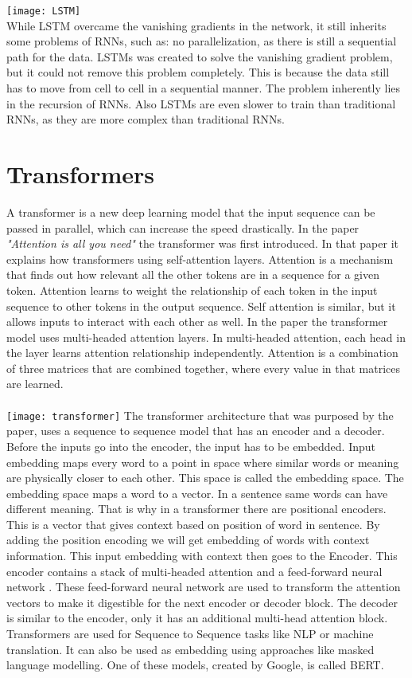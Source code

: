 \texttt{[image: LSTM]}
\\ While LSTM overcame the vanishing gradients in the network, it still inherits some problems of RNNs, such as: no parallelization, as there is still a sequential path for the data. LSTMs was created to solve the vanishing gradient problem, but it could not remove this problem completely. This is because the data still has to move from cell to cell in a sequential manner. The problem inherently lies in the recursion of RNNs. Also LSTMs are even slower to train than traditional RNNs, as they are more complex than traditional RNNs.

\section{Transformers}
A transformer is a new deep learning model that the input sequence can be passed in parallel, which can increase the speed drastically. In the paper \textit{"Attention is all you need"} \cite{Transformers} the transformer was first introduced. In that paper it explains how transformers using self-attention layers. Attention is a mechanism that finds out how relevant all the other tokens are in a sequence for a given token. Attention learns to weight the relationship of each token in the input sequence to other tokens in the output sequence. Self attention is similar, but it allows inputs to interact with each other as well. In the paper the transformer model uses multi-headed attention layers. In multi-headed attention, each head in the layer learns attention relationship independently. Attention is a combination of three matrices that are combined together, where every value in that matrices are learned.\\\\
\texttt{[image: transformer]}
The transformer architecture that was purposed by the paper, uses a sequence to sequence model \cite{sts} that has an encoder and a decoder. Before the inputs go into the encoder, the input has to be embedded. Input embedding maps every word to a point in space where similar words or meaning are physically closer to each other. This space is called the embedding space. The embedding space maps a word to a vector. In a sentence same words can have different meaning. That is why in a transformer there are positional encoders. This is a vector that gives context based on position of word in sentence. By adding the position encoding we will get embedding of words with context information. This input embedding with context then goes to the Encoder. This encoder contains a stack of multi-headed attention and a feed-forward neural network \cite{ffn}. These feed-forward neural network are used to transform the attention vectors to make it digestible for the next encoder or decoder block. The decoder is similar to the encoder, only it has an additional multi-head attention block. Transformers are used for Sequence to Sequence tasks like NLP or machine translation. It can also be used as embedding using approaches like masked language modelling. One of these models, created by Google, is called BERT.

